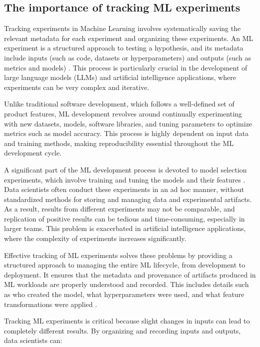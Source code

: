 \begin{itemize}
\newpage

\section{The importance of tracking ML experiments}

Tracking experiments in Machine Learning involves systematically saving the relevant metadata for each experiment and organizing these experiments. An ML experiment is a structured approach to testing a hypothesis, and its metadata include inputs (such as code, datasets or hyperparameters) and outputs (such as metrics and models) \cite{wandb2023}. This process is particularly crucial in the development of large language models (LLMs) and artificial intelligence applications, where experiments can be very complex and iterative.

Unlike traditional software development, which follows a well-defined set of product features, ML development revolves around continually experimenting with new datasets, models, software libraries, and tuning parameters to optimize metrics such as model accuracy. This process is highly dependent on input data and training methods, making reproducibility essential throughout the ML development cycle.

A significant part of the ML development process is devoted to model selection experiments, which involve training and tuning the models and their features \cite{schelter2017automatically}. Data scientists often conduct these experiments in an ad hoc manner, without standardized methods for storing and managing data and experimental artifacts. As a result, results from different experiments may not be comparable, and replication of positive results can be tedious and time-consuming, especially in larger teams. This problem is exacerbated in artificial intelligence applications, where the complexity of experiments increases significantly.

Effective tracking of ML experiments solves these problems by providing a structured approach to managing the entire ML lifecycle, from development to deployment. It ensures that the metadata and provenance of artifacts produced in ML workloads are properly understood and recorded. This includes details such as who created the model, what hyperparameters were used, and what feature transformations were applied \cite{schelter2017automatically}.

Tracking ML experiments is critical because slight changes in inputs can lead to completely different results. By organizing and recording inputs and outputs, data scientists can:


\end{itemize}
